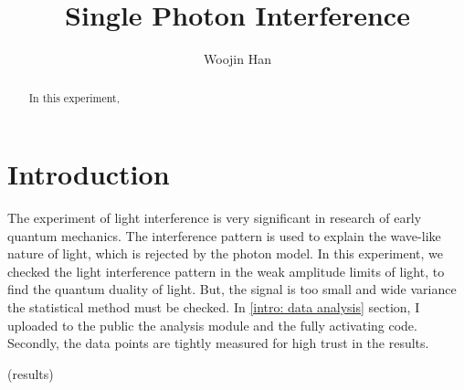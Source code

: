 \documentclass{article}
\begin{document}
\title{Single Photon Interference}
\author[1]{Woojin Han}
\maketitle

\begin{abstract}
    In this experiment,

\end{abstract}
\section{Introduction}
 The experiment of light interference is very significant in research of early quantum mechanics.
The interference pattern is used to explain the wave-like nature of light, which is rejected by the photon model.
In this experiment, we checked the light interference pattern in the weak amplitude limits of light, to find the quantum duality of light.
But, the signal is too small and wide variance the statistical method must be checked.
In \ref{intro: data analysis} section, I uploaded to the public the analysis module and the fully activating code.
Secondly, the data points are tightly measured for high trust in the results.

(results)
\end{document}

